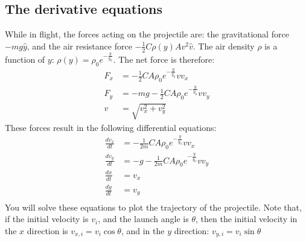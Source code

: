\documentclass{article}
\begin{document}
\subsection*{The derivative equations}
While in flight, the forces acting on the projectile are: the gravitational force $-mg\hat{y}$, and the air resistance force $-\frac{1}{2}C\rho(y) A v^2 \hat{v}$. The air density $\rho$ is a function of $y$: $\rho(y)=\rho_0 e^{-\frac{y}{y_0}}$. The net force is therefore:
\begin{align*}
	F_x&=-\frac{1}{2}CA\rho_0 e^{-\frac{y}{y_0}}vv_x\\
	F_y&=-mg-\frac{1}{2}CA\rho_0 e^{-\frac{y}{y_0}}vv_y\\
	v&=\sqrt{v_x^2+v_y^2}
\end{align*}
These forces result in the following differential equations:
\begin{align*}
	\frac{dv_x}{dt}&=-\frac{1}{2m}CA\rho_0 e^{-\frac{y}{y_0}}vv_x\\
	\frac{dv_y}{dt}&=-g-\frac{1}{2m}CA\rho_0 e^{-\frac{y}{y_0}}vv_y\\
	\frac{dx}{dt}&=v_x\\
	\frac{dy}{dt}&=v_y\\
\end{align*}
You will solve these equations to plot the trajectory of the projectile. Note that, if the initial velocity is $v_i$, and the launch angle is $\theta$, then the initial velocity in the $x$ direction is $v_{x,i}=v_i\cos{\theta}$, and in the $y$ direction: $v_{y,i}=v_i\sin{\theta}$\\
\end{document}
